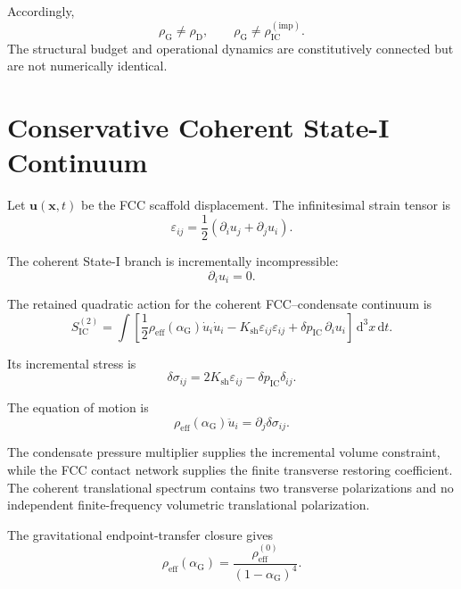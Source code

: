 Accordingly,
\begin{equation}
    \rho_{\mathrm{G}} \neq \rho_{\mathrm{D}}, \qquad \rho_{\mathrm{G}} \neq \rho_{\mathrm{IC}}^{(\mathrm{imp})}.
\end{equation}
The structural budget and operational dynamics are constitutively connected but are not numerically identical.

\section{Conservative Coherent State-I Continuum}

Let $\mathbf{u}(\mathbf{x},t)$ be the FCC scaffold displacement. The infinitesimal strain tensor is
\begin{equation}
    \varepsilon_{ij} = \frac{1}{2} \left( \partial_i u_j + \partial_j u_i \right).
\end{equation}

The coherent State-I branch is incrementally incompressible:
\begin{equation}
    \partial_i u_i = 0.
\end{equation}

The retained quadratic action for the coherent FCC--condensate continuum is
\begin{equation}
    S_{\mathrm{IC}}^{(2)} = \int \left[ \frac{1}{2} \rho_{\mathrm{eff}}(\alpha_{\mathrm{G}}) \dot{u}_i\dot{u}_i - K_{\mathrm{sh}} \varepsilon_{ij}\varepsilon_{ij} + \delta p_{\mathrm{IC}}\,\partial_i u_i \right] \,\mathrm{d}^3x\,\mathrm{d}t.
\end{equation}

Its incremental stress is
\begin{equation}
    \delta\sigma_{ij} = 2K_{\mathrm{sh}}\varepsilon_{ij} - \delta p_{\mathrm{IC}}\delta_{ij}.
\end{equation}

The equation of motion is
\begin{equation}
    \rho_{\mathrm{eff}}(\alpha_{\mathrm{G}}) \ddot{u}_i = \partial_j\delta\sigma_{ij}.
\end{equation}

The condensate pressure multiplier supplies the incremental volume constraint, while the FCC contact network supplies the finite transverse restoring coefficient. The coherent translational spectrum contains two transverse polarizations and no independent finite-frequency volumetric translational polarization.

The gravitational endpoint-transfer closure gives
\begin{equation}
    \rho_{\mathrm{eff}}(\alpha_{\mathrm{G}})
    =
    \frac{\rho_{\mathrm{eff}}^{(0)}}{(1-\alpha_{\mathrm{G}})^{4}}.
\end{equation}


